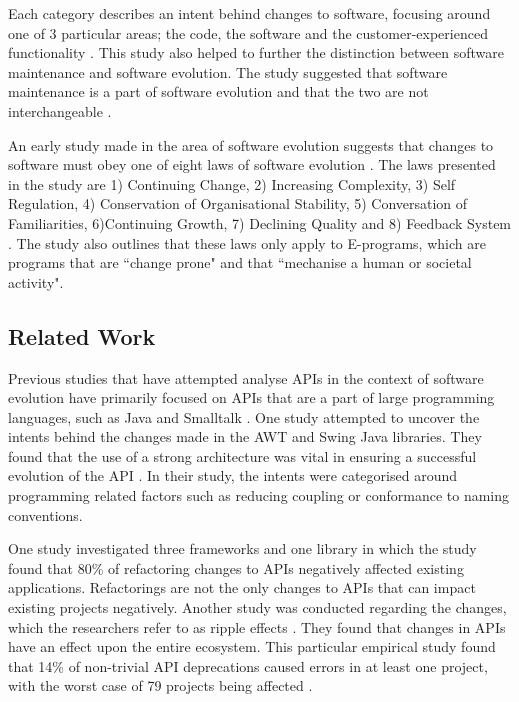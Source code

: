 \documentclass[10pt,twocolumn]{article}
\begin{document}
Each category describes an intent behind changes to software, focusing around one of 3 particular areas; the code, the software and the customer-experienced functionality \cite{chapin2001types}. This study also helped to further the distinction between software maintenance and software evolution. The study suggested that software maintenance is a part of software evolution and that the two are not interchangeable \cite{chapin2001types}. 

An early study made in the area of software evolution suggests that changes to software must obey one of eight laws of software evolution \cite{lehman1980programs}. The laws presented in the study are 1) Continuing Change, 2) Increasing Complexity, 3) Self Regulation, 4) Conservation of Organisational Stability, 5) Conversation of Familiarities, 6)Continuing Growth, 7) Declining Quality and 8) Feedback System \cite{lehman1980programs}. The study also outlines that these laws only apply to E-programs, which are programs that are ``change prone" and that ``mechanise a human or societal activity". 

\subsection{Related Work}
Previous studies that have attempted analyse APIs in the context of software evolution have primarily focused on APIs that are a part of large programming languages, such as Java \cite{shi2011empirical} \cite{hou2011exploring} and Smalltalk \cite{robbes2012developers}. One study \cite{hou2011exploring} attempted to uncover the intents behind the changes made in the AWT and Swing Java libraries. They found that the use of a strong architecture was vital in ensuring a successful evolution of the API \cite{hou2011exploring}. In their study, the intents were categorised around programming related factors such as reducing coupling or conformance to naming conventions.

One study \cite{dig2005role} investigated three frameworks and one library in which the study found that 80\% of refactoring changes to APIs negatively affected existing applications. Refactorings are not the only changes to APIs that can impact existing projects negatively. Another study was conducted regarding the changes, which the researchers refer to as ripple effects \cite{robbes2012developers}. They found that changes in APIs have an effect upon the entire ecosystem. This particular empirical study found that 14\% of non-trivial API deprecations caused errors in at least one project, with the worst case of 79 projects being affected \cite{robbes2012developers}.
\end{document}
